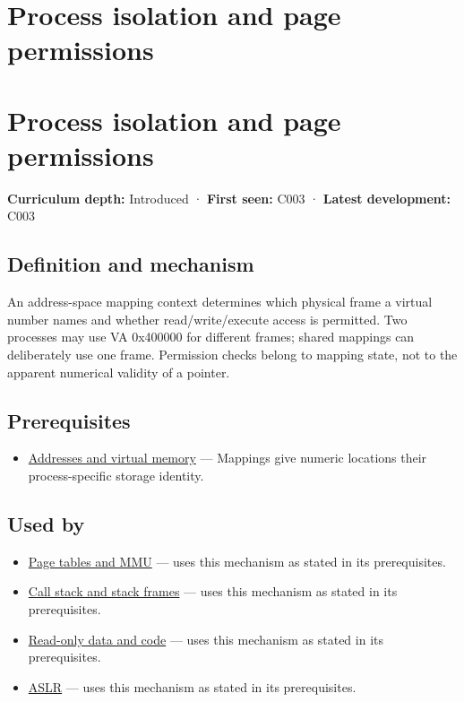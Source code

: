 \hypertarget{appendix-c2a9ad1e2b49}{}
\section*{Process isolation and page permissions}
\section{Process isolation and page permissions}\label{appendix-c2a9ad1e2b49-process-isolation-and-page-permissions}

\textbf{Curriculum depth:} Introduced · \textbf{First seen:} C003 · \textbf{Latest development:} C003

\subsection{Definition and mechanism}\label{appendix-c2a9ad1e2b49-definition-and-mechanism}

An address-space mapping context determines which physical frame a virtual number names and whether read/write/execute access is permitted. Two processes may use VA 0x400000 for different frames; shared mappings can deliberately use one frame. Permission checks belong to mapping state, not to the apparent numerical validity of a pointer.

\subsection{Prerequisites}\label{appendix-c2a9ad1e2b49-prerequisites}

\begin{itemize}
\tightlist
\item
  \hyperref[appendix-18ee4f913c3c]{Addresses and virtual memory} --- Mappings give numeric locations their process-specific storage identity.
\end{itemize}

\subsection{Used by}\label{appendix-c2a9ad1e2b49-used-by}

\begin{itemize}
\tightlist
\item
  \hyperref[appendix-01e5905165c4]{Page tables and MMU} --- uses this mechanism as stated in its prerequisites.
\item
  \hyperref[appendix-b081b7abe193]{Call stack and stack frames} --- uses this mechanism as stated in its prerequisites.
\item
  \hyperref[appendix-5f9e5e2f0a5e]{Read-only data and code} --- uses this mechanism as stated in its prerequisites.
\item
  \hyperref[appendix-78cb248c8355]{ASLR} --- uses this mechanism as stated in its prerequisites.
\end{itemize}


